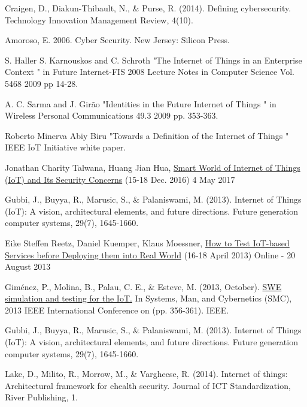 \documentclass[a4paper,english,11pt]{article}
\begin{document}
		
	\begin{thebibliography}{9}	
		
		Craigen, D., Diakun-Thibault, N., \& Purse, R. (2014). Defining cybersecurity. Technology Innovation Management Review, 4(10).
		
		Amoroso, E. 2006. Cyber Security. New Jersey: Silicon Press.
		
		S. Haller S. Karnouskos and C. Schroth "The Internet of Things in an Enterprise Context " in Future Internet-FIS 2008 Lecture Notes in Computer Science Vol. 5468 2009 pp 14-28.
		
		A. C. Sarma and J. Girão "Identities in the Future Internet of Things " in Wireless Personal Communications 49.3 2009 pp. 353-363.
		
		Roberto Minerva Abiy Biru "Towards a Definition of the Internet of Things " IEEE IoT Initiative white paper.
		
		Jonathan Charity Talwana, Huang Jian Hua, \href{http://ieeexplore.ieee.org/document/7917092/}{Smart World of Internet of Things (IoT) and Its Security Concerns} (15-18 Dec. 2016) 4 May 2017
		
		Gubbi, J., Buyya, R., Marusic, S., \& Palaniswami, M. (2013). Internet of Things (IoT): A vision, architectural elements, and future directions. Future generation computer systems, 29(7), 1645-1660.
		
		Eike Steffen Reetz, Daniel Kuemper, Klaus Moessner, \href{http://ieeexplore.ieee.org/document/6582811/}{How to Test IoT-based Services before Deploying them into Real World} (16-18 April 2013) Online - 20 August 2013
		
		Giménez, P., Molina, B., Palau, C. E., \& Esteve, M. (2013, October). \href{http://ieeexplore.ieee.org/document/6721820/}{SWE simulation and testing for the IoT.} In Systems, Man, and Cybernetics (SMC), 2013 IEEE International Conference on (pp. 356-361). IEEE.
		
		Gubbi, J., Buyya, R., Marusic, S., \& Palaniswami, M. (2013). Internet of Things (IoT): A vision, architectural elements, and future directions. Future generation computer systems, 29(7), 1645-1660.
				
		Lake, D., Milito, R., Morrow, M., \& Vargheese, R. (2014). Internet of things: Architectural framework for ehealth security. Journal of ICT Standardization, River Publishing, 1.
		

\end{thebibliography}
\end{document}
